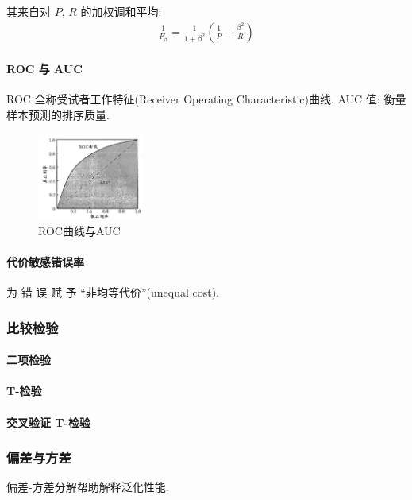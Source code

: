 其来自对 $P$, $R$ 的加权调和平均:
\begin{align*}
    \frac{1}{F_\beta}=\frac{1}{1+\beta^2}\left( \frac{1}{P}+\frac{\beta^2}{R} \right)
\end{align*}

\paragraph{ROC 与 AUC}ROC 全称受试者工作特征(Receiver Operating Characteristic)曲线. AUC 值: 衡量样本预测的排序质量. 

\begin{figure}[!htb]
    \centering
    \includegraphics[width=0.309\textwidth]{pic/ML2/ROC曲线与AUC.png}
    \caption{ROC曲线与AUC}
\end{figure}


\paragraph{代价敏感错误率}为 错 误 赋 予 ``非均等代价''(unequal cost).



\subsubsection{比较检验}%
\paragraph{二项检验}


\paragraph{T-检验}

\paragraph{交叉验证 T-检验}



\subsubsection{偏差与方差}
偏差-方差分解帮助解释泛化性能. 

